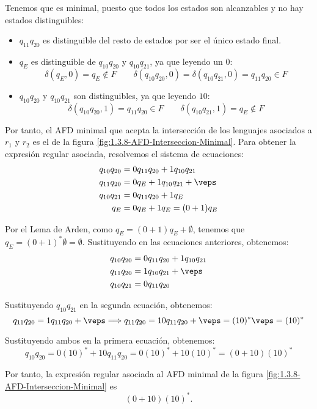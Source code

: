 \begin{ejercicio}
    Tenemos que es minimal, puesto que todos los estados son alcanzables y no hay estados distinguibles:
    \begin{itemize}
        \item $q_{11}q_{20}$ es distinguible del resto de estados por ser el único estado final.
        \item $q_{E}$ es distinguible de $q_{10}q_{20}$ y $q_{10}q_{21}$, ya que leyendo un $0$:
        \begin{equation*}
            \delta(q_{E},0)=q_{E}\notin F\qquad \delta(q_{10}q_{20},0)=\delta(q_{10}q_{21},0)=q_{11}q_{20}\in F
        \end{equation*}

        \item $q_{10}q_{20}$ y $q_{10}q_{21}$ son distinguibles, ya que leyendo $10$:
        \begin{equation*}
            \delta(q_{10}q_{20},1)=q_{11}q_{20}\in F\qquad \delta(q_{10}q_{21},1)=q_{E}\notin F
        \end{equation*}
    \end{itemize}

    Por tanto, el AFD minimal que acepta la intersección de los lenguajes asociados a $r_1$ y $r_2$ es el de la figura \ref{fig:1.3.8-AFD-Interseccion-Minimal}. Para obtener la expresión regular asociada, resolvemos el sistema de ecuaciones:
    \begin{align*}
        q_{10}q_{20} &= 0q_{11}q_{20}+1q_{10}q_{21}\\
        q_{11}q_{20} &= 0q_{E}+1q_{10}q_{21} + \veps\\
        q_{10}q_{21} &= 0q_{11}q_{20}+1q_{E}\\
        q_{E} &= 0q_{E}+1q_{E} = (0+1)q_{E}
    \end{align*}

    Por el Lema de Arden, como $q_E = (0+1)q_E + \emptyset$, tenemos que $q_E=(0+1)^*\emptyset = \emptyset$. Sustituyendo en las ecuaciones anteriores, obtenemos:
    \begin{align*}
        q_{10}q_{20} &= 0q_{11}q_{20}+1q_{10}q_{21}\\
        q_{11}q_{20} &= 1q_{10}q_{21} + \veps\\
        q_{10}q_{21} &= 0q_{11}q_{20}
    \end{align*}

    Sustituyendo $q_{10}q_{21}$ en la segunda ecuación, obtenemos:
    \begin{equation*}
        q_{11}q_{20} = 1q_{11}q_{20} + \veps \Longrightarrow q_{11}q_{20} = 10q_{11}q_{20}+ \veps = (10)^*\veps = (10)^*
    \end{equation*}

    Sustituyendo ambos en la primera ecuación, obtenemos:
    \begin{equation*}
        q_{10}q_{20} = 0(10)^* + 10q_{11}q_{20} = 0(10)^* + 10(10)^* = (0+10)(10)^*
    \end{equation*}

    Por tanto, la expresión regular asociada al AFD minimal de la figura \ref{fig:1.3.8-AFD-Interseccion-Minimal} es $$(0+10)(10)^*.$$    
\end{ejercicio}

